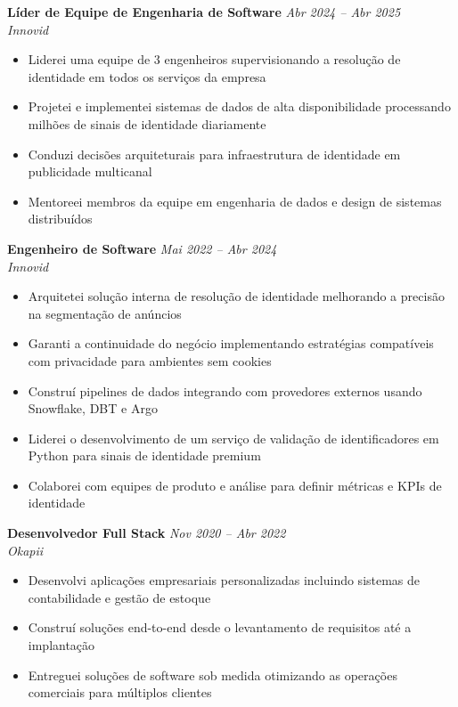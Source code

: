 \documentclass[10pt,a4paper]{article}
\newcommand{\cventry}[3]{%
  \textbf{#1} \hfill \textit{#3}\\[3pt]
  \textit{#2}%
}
\begin{document}
\cventry{Líder de Equipe de Engenharia de Software}{Innovid}{Abr 2024 -- Abr 2025}
\begin{itemize}[leftmargin=*, noitemsep, topsep=3pt, itemsep=2pt]
  \item Liderei uma equipe de 3 engenheiros supervisionando a resolução de
        identidade em todos os serviços da empresa
  \item Projetei e implementei sistemas de dados de alta disponibilidade
        processando milhões de sinais de identidade diariamente
  \item Conduzi decisões arquiteturais para infraestrutura de identidade em
        publicidade multicanal
  \item Mentoreei membros da equipe em engenharia de dados e design de
        sistemas distribuídos
\end{itemize}

\vspace{0.25cm}

\cventry{Engenheiro de Software}{Innovid}{Mai 2022 -- Abr 2024}
\begin{itemize}[leftmargin=*, noitemsep, topsep=3pt, itemsep=2pt]
  \item Arquitetei solução interna de resolução de identidade melhorando a
        precisão na segmentação de anúncios
  \item Garanti a continuidade do negócio implementando estratégias compatíveis
        com privacidade para ambientes sem cookies
  \item Construí pipelines de dados integrando com provedores externos usando
        Snowflake, DBT e Argo
  \item Liderei o desenvolvimento de um serviço de validação de identificadores
        em Python para sinais de identidade premium
  \item Colaborei com equipes de produto e análise para definir métricas e
        KPIs de identidade
\end{itemize}

\vspace{0.25cm}

\cventry{Desenvolvedor Full Stack}{Okapii}{Nov 2020 -- Abr 2022}
\begin{itemize}[leftmargin=*, noitemsep, topsep=3pt, itemsep=2pt]
  \item Desenvolvi aplicações empresariais personalizadas incluindo sistemas de
        contabilidade e gestão de estoque
  \item Construí soluções end-to-end desde o levantamento de requisitos até a
        implantação
  \item Entreguei soluções de software sob medida otimizando as operações
        comerciais para múltiplos clientes
\end{itemize}
\end{document}

